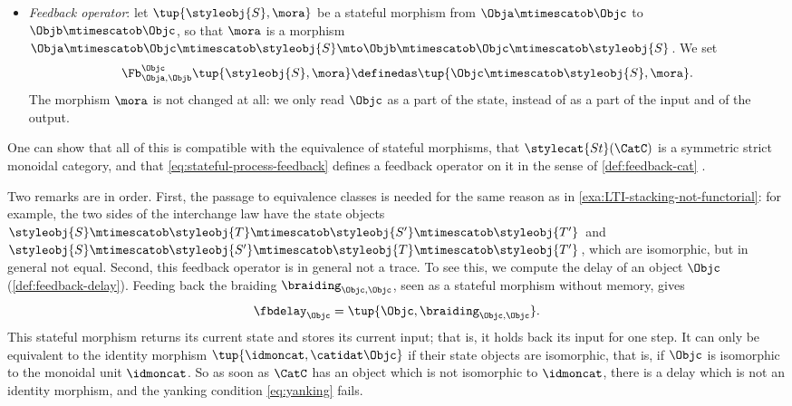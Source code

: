 \begin{itemize}
    \item \emph{Feedback operator}: let $\tup{\styleobj{S}, \mora}$ be a stateful morphism from $\Obja \mtimescatob \Objc$ to $\Objb \mtimescatob \Objc$, so that $\mora$ is a morphism $\Obja \mtimescatob \Objc \mtimescatob \styleobj{S} \mto \Objb \mtimescatob \Objc \mtimescatob \styleobj{S}$.
          We set
          \begin{equation}
              \label{eq:stateful-process-feedback}
              \Fb_{\Obja,\Objb}^{\Objc} \tup{\styleobj{S}, \mora} \definedas \tup{\Objc \mtimescatob \styleobj{S}, \mora}.
          \end{equation}
          The morphism $\mora$ is not changed at all: we only read $\Objc$ as a part of the state, instead of as a part of the input and of the output.
\end{itemize}
One can show that all of this is compatible with the equivalence of stateful morphisms, that $\stylecat{St}(\CatC)$ is a symmetric strict monoidal category, and that \cref{eq:stateful-process-feedback} defines a feedback operator on it in the sense of \cref{def:feedback-cat} \cite{katis2002feedback}. 

Two remarks are in order.
First, the passage to equivalence classes is needed for the same reason as in \cref{exa:LTI-stacking-not-functorial}: for example, the two sides of the interchange law have the state objects $\styleobj{S} \mtimescatob \styleobj{T} \mtimescatob \styleobj{S'} \mtimescatob \styleobj{T'}$ and $\styleobj{S} \mtimescatob \styleobj{S'} \mtimescatob \styleobj{T} \mtimescatob \styleobj{T'}$, which are isomorphic, but in general not equal.
Second, this feedback operator is in general not a trace.
To see this, we compute the delay of an object $\Objc$ (\cref{def:feedback-delay}).
Feeding back the braiding $\braiding_{\Objc,\Objc}$, seen as a stateful morphism without memory, gives
\begin{equation}
    \label{eq:stateful-process-delay}
    \fbdelay_{\Objc} = \tup{\Objc, \braiding_{\Objc,\Objc}}.
\end{equation}
This stateful morphism returns its current state and stores its current input; that is, it holds back its input for one step.
It can only be equivalent to the identity morphism $\tup{\idmoncat, \catidat\Objc}$ if their state objects are isomorphic, that is, if $\Objc$ is isomorphic to the monoidal unit $\idmoncat$.
So as soon as $\CatC$ has an object which is not isomorphic to $\idmoncat$, there is a delay which is not an identity morphism, and the yanking condition \cref{eq:yanking} fails.

